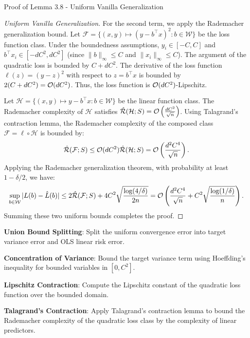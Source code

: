 \begin{sourceblock}{Proof of Lemma 3.8 - Uniform Vanilla Generalization}
\begin{proof}[Uniform Vanilla Generalization]
For the second term, we apply the Rademacher generalization bound. Let $\mathcal{F} = \{(x, y) \mapsto (y - b^\top x)^2 : b \in \mathcal{W}\}$ be the loss function class. Under the boundedness assumptions, $y_i \in [-C, C]$ and $b^\top x_i \in [-dC^2, dC^2]$ (since $\|b\|_\infty \le C$ and $\|x_i\|_\infty \le C$). The argument of the quadratic loss is bounded by $C + dC^2$. The derivative of the loss function $\ell(z) = (y - z)^2$ with respect to $z = b^\top x$ is bounded by $2(C + dC^2) = \mathcal{O}(dC^2)$. Thus, the loss function is $\mathcal{O}(dC^2)$-Lipschitz.

Let $\mathcal{H} = \{(x, y) \mapsto y - b^\top x : b \in \mathcal{W}\}$ be the linear function class. The Rademacher complexity of $\mathcal{H}$ satisfies $\hat{\mathcal{R}}(\mathcal{H}; S) = \mathcal{O}\left( \frac{d C^2}{\sqrt{n}} \right)$. Using Talagrand's contraction lemma, the Rademacher complexity of the composed class $\mathcal{F} = \ell \circ \mathcal{H}$ is bounded by:
\begin{equation}
    \hat{\mathcal{R}}(\mathcal{F}; S) \le \mathcal{O}(dC^2) \hat{\mathcal{R}}(\mathcal{H}; S) = \mathcal{O}\left( \frac{d^2 C^4}{\sqrt{n}} \right).
\end{equation}
Applying the Rademacher generalization theorem, with probability at least $1 - \delta/2$, we have:
\begin{equation}
    \sup_{b \in \mathcal{W}} |L(b) - \hat{L}(b)| \le 2\hat{\mathcal{R}}(\mathcal{F}; S) + 4C^2 \sqrt{\frac{\log(4/\delta)}{2n}} = \mathcal{O}\left( \frac{d^2 C^4}{\sqrt{n}} + C^2\sqrt{\frac{\log(1/\delta)}{n}} \right).
\end{equation}
Summing these two uniform bounds completes the proof.
\end{proof}
\end{sourceblock}

\begin{guideblock}
\item \textbf{Union Bound Splitting}: Split the uniform convergence error into target variance error and OLS linear risk error.
\item \textbf{Concentration of Variance}: Bound the target variance term using Hoeffding's inequality for bounded variables in $[0, C^2]$.
\item \textbf{Lipschitz Contraction}: Compute the Lipschitz constant of the quadratic loss function over the bounded domain.
\item \textbf{Talagrand's Contraction}: Apply Talagrand's contraction lemma to bound the Rademacher complexity of the quadratic loss class by the complexity of linear predictors.
\end{guideblock}


